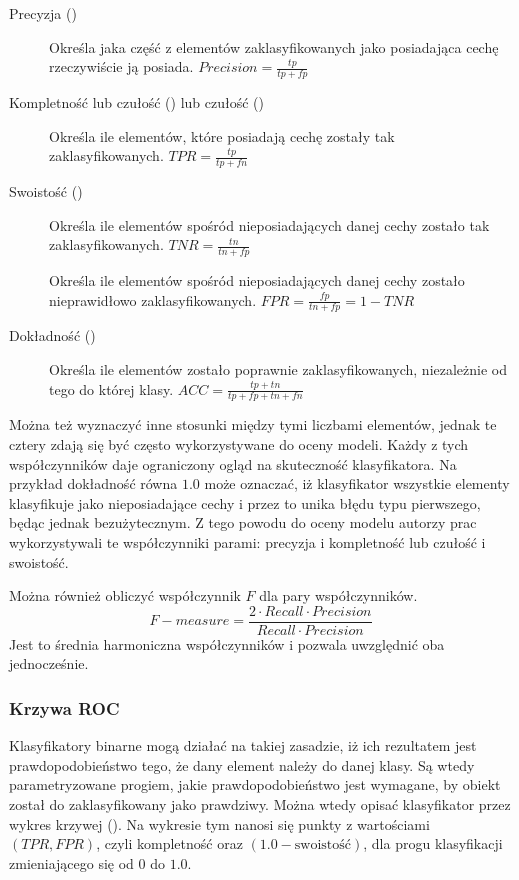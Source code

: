 \begin{description}
    \item[Precyzja ()] Określa jaka część z elementów zaklasyfikowanych jako posiadająca cechę rzeczywiście ją posiada. $\mathit{Precision} = \frac{tp}{tp + fp}$
    \item[Kompletność lub czułość () lub czułość ()]
        Określa ile elementów, które posiadają cechę zostały tak zaklasyfikowanych. $\mathit{TPR} = \frac{tp}{tp + fn}$
    \item[Swoistość ()] Określa ile elementów spośród
        nieposiadających danej cechy zostało tak zaklasyfikowanych. $\mathit{TNR} = \frac{tn}{tn + fp}$
    \item[] Określa ile elementów spośród
        nieposiadających danej cechy zostało nieprawidłowo zaklasyfikowanych. $\mathit{FPR} = \frac{fp}{tn + fp} = 1 - \mathit{TNR}$
    \item[Dokładność ()] Określa ile elementów zostało poprawnie zaklasyfikowanych,
        niezależnie od tego do której klasy. $\mathit{ACC} = \frac{tp + tn}{tp + fp + tn + fn}$
\end{description}

Można też wyznaczyć inne stosunki między tymi liczbami elementów,
jednak te cztery zdają się być często wykorzystywane do oceny modeli.
Każdy z tych współczynników daje ograniczony ogląd na skuteczność
klasyfikatora. Na przykład dokładność równa $1.0$ może oznaczać,
iż klasyfikator wszystkie elementy klasyfikuje jako nieposiadające
cechy i przez to unika błędu typu pierwszego, będąc jednak bezużytecznym.
Z tego powodu do oceny modelu autorzy prac wykorzystywali te
współczynniki parami: precyzja i kompletność lub czułość i swoistość.

Można również obliczyć współczynnik $F$ dla pary współczynników.
$$\mathit{F{-}measure} = \frac{2 \cdot Recall \cdot Precision}{Recall \cdot Precision}$$
Jest to średnia harmoniczna współczynników i pozwala uwzględnić oba jednocześnie.

\subsubsection{Krzywa ROC}

Klasyfikatory binarne mogą działać na takiej zasadzie, iż ich rezultatem jest prawdopodobieństwo
tego, że dany element należy do danej klasy. Są wtedy parametryzowane progiem,
jakie prawdopodobieństwo jest wymagane, by obiekt został do zaklasyfikowany jako prawdziwy.
Można wtedy opisać klasyfikator przez wykres krzywej 
(). Na wykresie tym nanosi się punkty z wartościami
$(\mathit{TPR}, \mathit{FPR})$, czyli kompletność oraz $(1.0 - \text{swoistość})$, dla progu klasyfikacji
zmieniającego się od $0$ do $1.0$.

